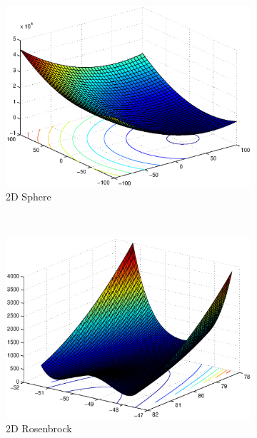 \documentclass{csfourzero}
\begin{document}
\begin{figure}
  \centering
  \begin{subfigure}[b]{0.3\textwidth}
    \includegraphics[width=\textwidth]{../functions/sphere_shifted.eps}
    \caption{2D Sphere}
    \label{fig:sphere}
  \end{subfigure}
  ~
  \begin{subfigure}[b]{0.3\textwidth}
    \includegraphics[width=\textwidth]{../functions/rosenbrock_shifted.eps}
    \caption{2D Rosenbrock}
    \label{fig:rosenbrock}
  \end{subfigure}
  ~
  \begin{subfigure}[b]{0.3\textwidth}

\end{subfigure}
\end{figure}
\end{document}

